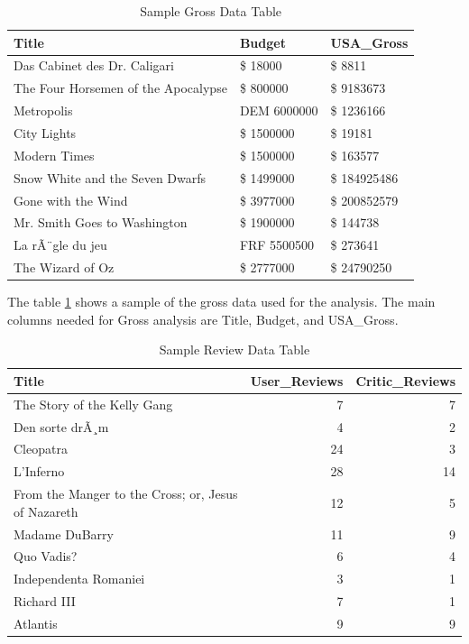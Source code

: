 \documentclass[11pt,a4paper,]{article}
\begin{document}
\begin{table}

\caption{\label{tab:GrossTable}Sample Gross Data Table}
\centering
\begin{tabular}[t]{lll}
\toprule
Title & Budget & USA\_Gross\\
\midrule
Das Cabinet des Dr. Caligari & \$ 18000 & \$ 8811\\
The Four Horsemen of the Apocalypse & \$ 800000 & \$ 9183673\\
Metropolis & DEM 6000000 & \$ 1236166\\
City Lights & \$ 1500000 & \$ 19181\\
Modern Times & \$ 1500000 & \$ 163577\\
\addlinespace
Snow White and the Seven Dwarfs & \$ 1499000 & \$ 184925486\\
Gone with the Wind & \$ 3977000 & \$ 200852579\\
Mr. Smith Goes to Washington & \$ 1900000 & \$ 144738\\
La rÃ¨gle du jeu & FRF 5500500 & \$ 273641\\
The Wizard of Oz & \$ 2777000 & \$ 24790250\\
\bottomrule
\end{tabular}
\end{table}

The table \ref{tab:GrossTable} shows a sample of the gross data used for the analysis. The main columns needed for Gross analysis are Title, Budget, and USA\_Gross.

\begin{table}

\caption{\label{tab:ReviewTable}Sample Review Data Table}
\centering
\begin{tabular}[t]{lrr}
\toprule
Title & User\_Reviews & Critic\_Reviews\\
\midrule
The Story of the Kelly Gang & 7 & 7\\
Den sorte drÃ¸m & 4 & 2\\
Cleopatra & 24 & 3\\
L'Inferno & 28 & 14\\
From the Manger to the Cross; or, Jesus of Nazareth & 12 & 5\\
\addlinespace
Madame DuBarry & 11 & 9\\
Quo Vadis? & 6 & 4\\
Independenta Romaniei & 3 & 1\\
Richard III & 7 & 1\\
Atlantis & 9 & 9\\
\bottomrule
\end{tabular}
\end{table}
\end{document}
